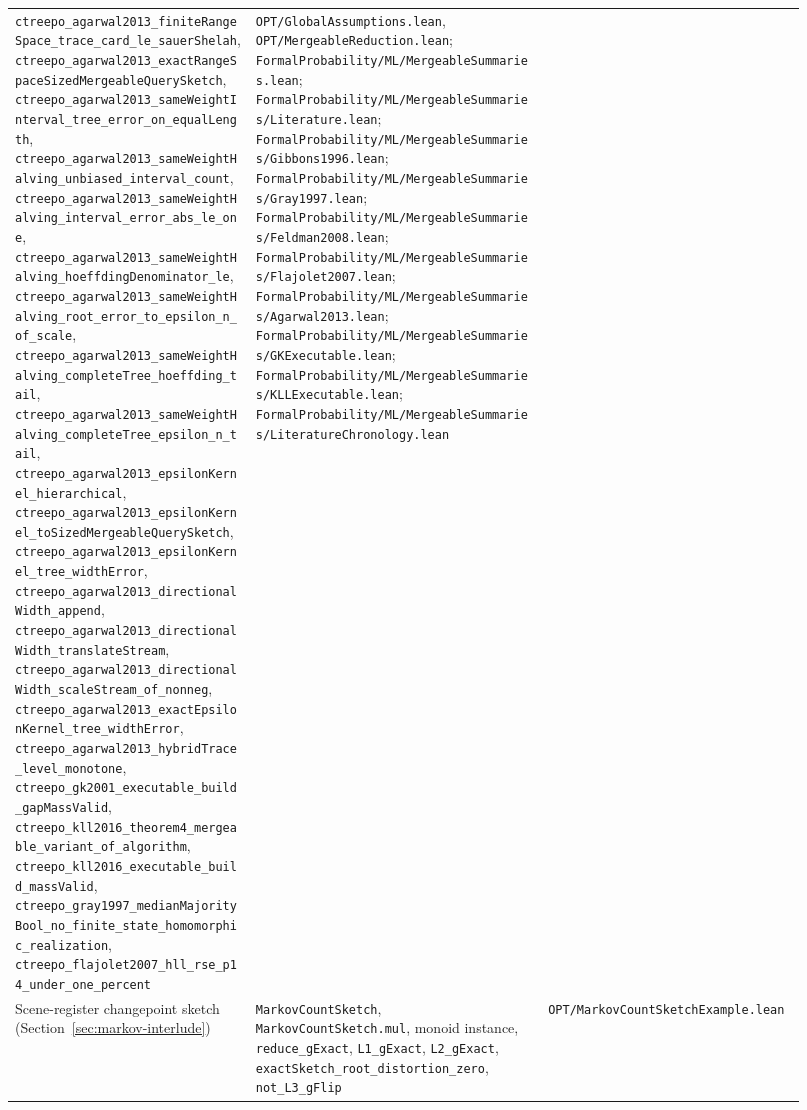 \begin{table}[h]
\begin{tabular}{p{0.28\linewidth}p{0.34\linewidth}p{0.30\linewidth}}
\nolinkurl{ctreepo_agarwal2013_finiteRangeSpace_trace_card_le_sauerShelah},
\nolinkurl{ctreepo_agarwal2013_exactRangeSpaceSizedMergeableQuerySketch},
\nolinkurl{ctreepo_agarwal2013_sameWeightInterval_tree_error_on_equalLength},
\nolinkurl{ctreepo_agarwal2013_sameWeightHalving_unbiased_interval_count},
\nolinkurl{ctreepo_agarwal2013_sameWeightHalving_interval_error_abs_le_one},
\nolinkurl{ctreepo_agarwal2013_sameWeightHalving_hoeffdingDenominator_le},
\nolinkurl{ctreepo_agarwal2013_sameWeightHalving_root_error_to_epsilon_n_of_scale},
\nolinkurl{ctreepo_agarwal2013_sameWeightHalving_completeTree_hoeffding_tail},
\nolinkurl{ctreepo_agarwal2013_sameWeightHalving_completeTree_epsilon_n_tail},
\texttt{ctreepo\_agarwal2013\_epsilonKernel\_hierarchical},
\nolinkurl{ctreepo_agarwal2013_epsilonKernel_toSizedMergeableQuerySketch},
\nolinkurl{ctreepo_agarwal2013_epsilonKernel_tree_widthError},
\nolinkurl{ctreepo_agarwal2013_directionalWidth_append},
\nolinkurl{ctreepo_agarwal2013_directionalWidth_translateStream},
\nolinkurl{ctreepo_agarwal2013_directionalWidth_scaleStream_of_nonneg},
\nolinkurl{ctreepo_agarwal2013_exactEpsilonKernel_tree_widthError},
\texttt{ctreepo\_agarwal2013\_hybridTrace\_level\_monotone},
\texttt{ctreepo\_gk2001\_executable\_build\_gapMassValid},
\texttt{ctreepo\_kll2016\_theorem4\_mergeable\_variant\_of\_algorithm},
\texttt{ctreepo\_kll2016\_executable\_build\_massValid},
\texttt{ctreepo\_gray1997\_medianMajorityBool\_no\_finite\_state\_homomorphic\_realization},
\texttt{ctreepo\_flajolet2007\_hll\_rse\_p14\_under\_one\_percent} &
\texttt{OPT/GlobalAssumptions.lean}, \texttt{OPT/MergeableReduction.lean};
\texttt{FormalProbability/ML/MergeableSummaries.lean};
\texttt{FormalProbability/ML/MergeableSummaries/Literature.lean};
\texttt{FormalProbability/ML/MergeableSummaries/Gibbons1996.lean};
\texttt{FormalProbability/ML/MergeableSummaries/Gray1997.lean};
\texttt{FormalProbability/ML/MergeableSummaries/Feldman2008.lean};
\texttt{FormalProbability/ML/MergeableSummaries/Flajolet2007.lean};
\texttt{FormalProbability/ML/MergeableSummaries/Agarwal2013.lean};
\texttt{FormalProbability/ML/MergeableSummaries/GKExecutable.lean};
\texttt{FormalProbability/ML/MergeableSummaries/KLLExecutable.lean};
\texttt{FormalProbability/ML/MergeableSummaries/LiteratureChronology.lean} \\

Scene-register changepoint sketch (Section~\ref{sec:markov-interlude}) &
\texttt{MarkovCountSketch}, \texttt{MarkovCountSketch.mul}, monoid instance,
\texttt{reduce\_gExact}, \texttt{L1\_gExact}, \texttt{L2\_gExact},
\texttt{exactSketch\_root\_distortion\_zero}, \texttt{not\_L3\_gFlip} &
\texttt{OPT/MarkovCountSketchExample.lean} \\


\end{tabular}
\end{table}
